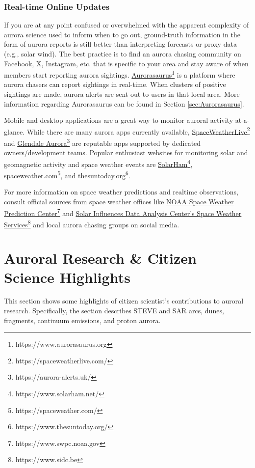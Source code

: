 \documentclass{article}
\renewcommand{\cite}[1]{\parencite{#1}}
\begin{document}
\subsubsection{Real-time Online Updates}
If you are at any point confused or overwhelmed with the apparent complexity of aurora science used to inform when to go out, ground-truth information in the form of aurora reports is still better than interpreting forecasts or proxy data (e.g., solar wind). The best practice is to find an aurora chasing community on Facebook, X, Instagram, etc. that is specific to your area and stay aware of when members start reporting aurora sightings. \href{https://www.aurorasaurus.org}{Aurorasaurus}\footnote{https://www.aurorasaurus.org} \cite{MacDonald2015} is a platform where aurora chasers can report sightings in real-time. When clusters of positive sightings are made, aurora alerts are sent out to users in that local area. More information regarding Aurorasaurus can be found in Section \ref{sec:Aurorasaurus}.

Mobile and desktop applications are a great way to monitor auroral activity at-a-glance. While there are many aurora apps currently available, \href{https://spaceweatherlive.com/}{SpaceWeatherLive}\footnote{https://spaceweatherlive.com/} and \href{https://aurora-alerts.uk/}{Glendale Aurora}\footnote{https://aurora-alerts.uk/} are reputable apps supported by dedicated owners/development teams. Popular enthusiast websites for monitoring solar and geomagnetic activity and space weather events are \href{https://www.solarham.net/}{SolarHam}\footnote{https://www.solarham.net/}, \href{https://spaceweather.com/}{spaceweather.com}\footnote{https://spaceweather.com/}, and \href{https://www.thesuntoday.org/}{thesuntoday.org}\footnote{https://www.thesuntoday.org/}.

For more information on space weather predictions and realtime observations, consult official sources from space weather offices like \href{https://www.swpc.noaa.gov}{NOAA Space Weather Prediction Center}\footnote{https://www.swpc.noaa.gov} and \href{https://www.sidc.be}{Solar Influences Data Analysis Center's Space Weather Services}\footnote{https://www.sidc.be} and local aurora chasing groups on social media.

\section{Auroral Research \& Citizen Science Highlights}
This section shows some highlights of citizen scientist's contributions to auroral research. Specifically, the section describes STEVE and SAR arcs, dunes, fragments, continuum emissions, and proton aurora.
\end{document}
